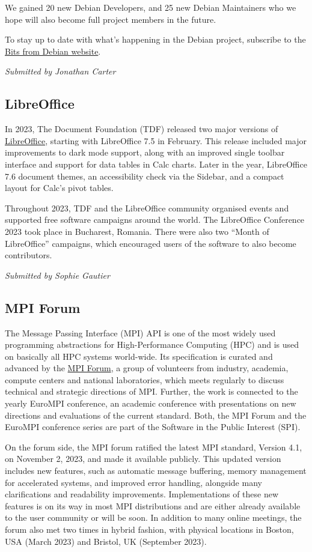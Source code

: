 \documentclass[a4paper]{report}
\begin{document}
We gained 20 new Debian Developers, and 25 new Debian Maintainers who we hope will also become full project members in the future.

To stay up to date with what's happening in the Debian project, subscribe to
the \href{https://bits.debian.org/}{Bits from Debian website}.

{\em Submitted by Jonathan Carter}

\subsection{LibreOffice}

In 2023, The Document Foundation (TDF) released two major versions of \href{https://www.libreoffice.org/}{LibreOffice}, starting with LibreOffice 7.5 in February. This release included major improvements to dark mode support, along with an improved single toolbar interface and support for data tables in Calc charts. Later in the year, LibreOffice 7.6 document themes, an accessibility check via the Sidebar, and a compact layout for Calc's pivot tables.

Throughout 2023, TDF and the LibreOffice community organised events and supported free software campaigns around the world. The LibreOffice Conference 2023 took place in Bucharest, Romania. There were also two ``Month of LibreOffice'' campaigns, which encouraged users of the software to also become contributors.

{\em Submitted by Sophie Gautier}

\subsection{MPI Forum}

The Message Passing Interface (MPI) API is one of the most widely used programming abstractions for High-Performance Computing (HPC) and is used on basically all HPC systems world-wide. Its specification is curated and advanced by the \href{https://www.mpi-forum.org/}{MPI Forum}, a group of volunteers from industry, academia, compute centers and national laboratories, which meets regularly to discuss technical and strategic directions of MPI. Further, the work is connected to the yearly EuroMPI conference, an academic conference with presentations on new directions and evaluations of the current standard. Both, the MPI Forum and the EuroMPI conference series are part of the Software in the Public Interest (SPI).

On the forum side, the MPI forum ratified the latest MPI standard, Version 4.1, on November 2, 2023, and made it available publicly. This updated version includes new features, such as automatic message buffering, memory management for accelerated systems, and improved error handling, alongside many clarifications and readability improvements. Implementations of these new features is on its way in most MPI distributions and are either already available to the user community or will be soon. In addition to many online meetings, the forum also met two times in hybrid fashion, with physical locations in Boston, USA (March 2023) and Bristol, UK (September 2023).
\end{document}
